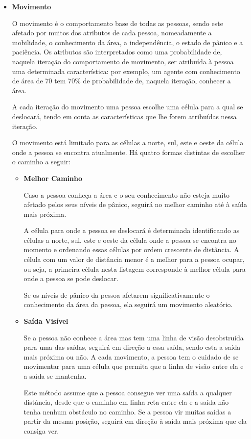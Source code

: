 \documentclass[12pt]{article}
\begin{document}
\begin{titlepage}
\begin{itemize}
\item \textbf{Movimento}

O movimento é o comportamento base de todas as pessoas, sendo este afetado por muitos dos atributos de cada pessoa, nomeadamente a mobilidade, o conhecimento da área, a independência, o estado de pânico e a paciência. Os atributos são interpretados como uma probabilidade de, naquela iteração do comportamento de movimento, ser atribuída à pessoa uma determinada característica: por exemplo, um agente com conhecimento de área de 70 tem 70\% de probabilidade de, naquela iteração, conhecer a área.

A cada iteração do movimento uma pessoa escolhe uma célula para a qual se deslocará, tendo em conta as características que lhe forem atribuídas nessa iteração.

O movimento está limitado para as células a norte, sul, este e oeste da célula onde a pessoa se encontra atualmente. Há quatro formas distintas de escolher o caminho a seguir:
\begin{itemize}

\item \textbf{Melhor Caminho}

Caso a pessoa conheça a área e o seu conhecimento não esteja muito afetado pelos seus níveis de pânico, seguirá no melhor caminho até à saída mais próxima. 

A célula para onde a pessoa se deslocará é determinada identificando as células a norte, sul, este e oeste da célula onde a pessoa se encontra no momento e ordenando essas células por ordem crescente de distância. A célula com um valor de distância menor é a melhor para a pessoa ocupar, ou seja, a primeira célula nesta listagem corresponde à melhor célula para onde a pessoa se pode deslocar.

Se os níveis de pânico da pessoa afetarem significativamente o conhecimento da área da pessoa, ela seguirá um movimento aleatório.

\item \textbf{Saída Visível}

Se a pessoa não conhece a área mas tem uma linha de visão desobstruída para uma das saídas, seguirá em direção a essa saída, sendo esta a saída mais próxima ou não. A cada movimento, a pessoa tem o cuidado de se movimentar para uma célula que permita que a linha de visão entre ela e a saída se mantenha.

Este método assume que a pessoa consegue ver uma saída a qualquer distância, desde que o caminho em linha reta entre ela e a saída não tenha nenhum obstáculo no caminho. Se a pessoa vir muitas saídas a partir da mesma posição, seguirá em direção à saída mais próxima que ela consiga ver.


\end{itemize}
\end{itemize}
\end{titlepage}
\end{document}
